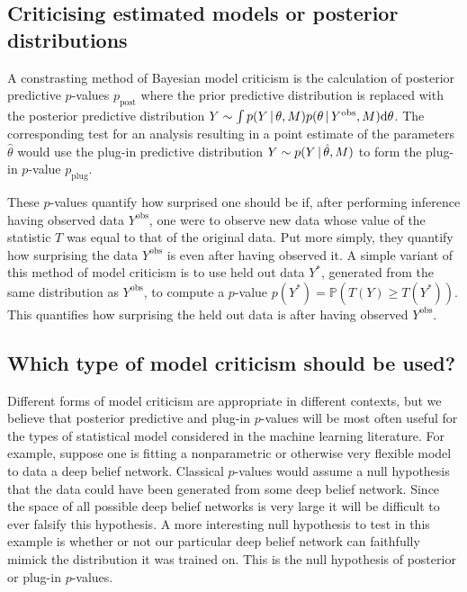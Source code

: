 \subsection{Criticising estimated models or posterior distributions}

A constrasting method of Bayesian model criticism is the calculation of posterior predictive $p$-values \citep[e.g.][]{Guttman1967-my, Rubin1984-tw} $p_\textrm{post}$ where the prior predictive distribution is replaced with the posterior predictive distribution ${Y \sim \int p(Y \,|\, \theta, M)p(\theta \,|\, Y^\textrm{obs}, M) \mathrm{d}\theta}$.
The corresponding test for an analysis resulting in a point estimate of the parameters $\hat\theta$ would use the plug-in predictive distribution ${Y \sim p(Y \,|\, \hat\theta, M)}$ to form the plug-in $p$-value $p_\textrm{plug}$.

These $p$-values quantify how surprised one should be if, after performing inference having observed data $Y^\textrm{obs}$, one were to observe new data whose value of the statistic $T$ was equal to that of the original data.
Put more simply, they quantify how surprising the data $Y^\textrm{obs}$ is even after having observed it.
A simple variant of this method of model criticism is to use held out data $Y^*$, generated from the same distribution as $Y^\textrm{obs}$, to compute a $p$-value \ie ${p(Y^*) = \mathbb{P}(T(Y)\geq T(Y^*))}$.
This quantifies how surprising the held out data is after having observed $Y^\textrm{obs}$.

\subsection{Which type of model criticism should be used?}

Different forms of model criticism are appropriate in different contexts, but we believe that posterior predictive and plug-in $p$-values will be most often useful for the types of statistical model considered in the machine learning literature.
For example, suppose one is fitting a nonparametric or otherwise very flexible model to data \eg a deep belief network.
Classical $p$-values would assume a null hypothesis that the data could have been generated from some deep belief network.
Since the space of all possible deep belief networks is very large it will be difficult to ever falsify this hypothesis.
A more interesting null hypothesis to test in this example is whether or not our particular deep belief network can faithfully mimick the distribution it was trained on.
This is the null hypothesis of posterior or plug-in $p$-values.

